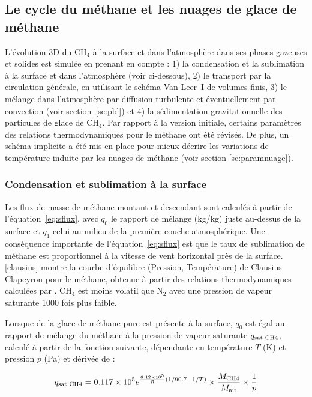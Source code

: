 \subsection{Le cycle du méthane et les nuages de glace de méthane}
\label{sc:ch4_model}

L’évolution 3D du CH$_4$ à la surface et dans l’atmosphère dans ses phases gazeuses et solides est simulée en prenant en compte : 1) la condensation et la sublimation à la surface et dans l’atmosphère (voir ci-dessous), 2) le transport par la circulation générale, en utilisant le schéma Van-Leer~I de volumes finis, 3) le mélange dans l’atmosphère par diffusion turbulente et éventuellement par convection (voir section~\ref{sc:pbl}) et 4) la sédimentation gravitationnelle des particules de glace de CH$_4$.
Par rapport à la version initiale, certains paramètres des relations thermodynamiques pour le méthane ont été révisés. De plus, un schéma implicite a été mis en place pour mieux décrire les variations de  température induite par les nuages de méthane (voir section \ref{sc:paramnuage}). 

\subsubsection{Condensation et sublimation à la surface}
Les flux de masse de méthane montant et descendant sont calculés à partir de l’équation~\ref{eq:sflux}, avec $q_0$ le rapport de mélange (kg/kg) juste au-dessus de la surface et $q_1$ celui au milieu de la première couche atmosphérique. Une conséquence importante de l’équation~\ref{eq:sflux} est que le taux de sublimation de méthane est proportionnel à la vitesse de vent horizontal près de la surface. 
\autoref{clausius} montre la courbe d’équilibre (Pression, Température) de Clausius Clapeyron pour le méthane, obtenue à partir des relations thermodynamiques calculées par \citet{FraySchm:09}. CH$_4$ est moins volatil que N$_2$ avec une pression de vapeur saturante 1000 fois plus faible. 

Lorsque de la glace de méthane pure est présente à la surface, $q_0$ est égal au rapport de mélange du méthane à la pression de vapeur saturante $q_{\mbox{\scriptsize  sat CH4}}$, calculé à partir de la fonction suivante, dépendante en température $T$ (K) et pression $p$ (Pa) et dérivée de \cite{FraySchm:09} :

\begin{equation}
q_{\mbox{\scriptsize sat CH4}} = 0.117 \times 10^{5}  
e^{{\frac{6.12 \times 10^{5}}{R}} 
\left(  {1}/{90.7} -{1}/{T} \right) } 
\times \frac{M_{\mbox{\scriptsize CH4}}}{M_{\mbox{\scriptsize air}}} \times \frac{1}{p}
\label{eq:ch4sat}
\end{equation}

